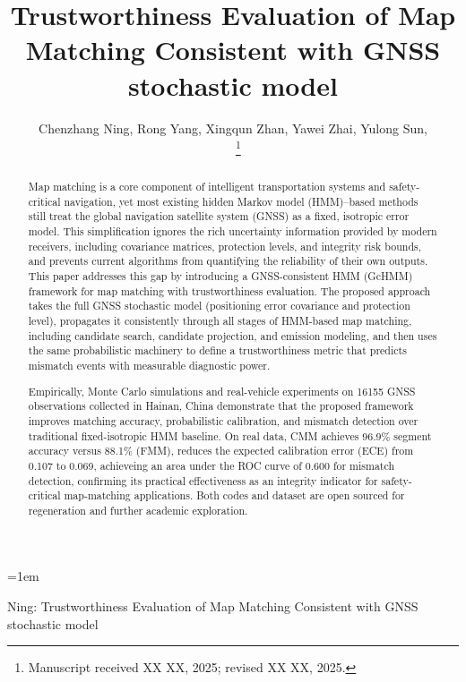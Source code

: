 \documentclass[letterpaper,journal]{IEEEtran}
\begin{document}
\emergencystretch=1em

\title{Trustworthiness Evaluation of Map Matching Consistent with GNSS stochastic model}

\author{Chenzhang Ning, Rong Yang, Xingqun Zhan, Yawei Zhai, Yulong Sun, \\~%
\thanks{Manuscript received XX XX, 2025; revised XX XX, 2025.}}

%
{Ning: Trustworthiness Evaluation of Map Matching Consistent with GNSS stochastic model}


\maketitle

\begin{abstract}
Map matching is a core component of intelligent transportation systems and
safety-critical navigation, yet most existing hidden Markov model (HMM)–based
methods still treat the global navigation satellite system (GNSS) as a fixed, isotropic error model. This simplification ignores the rich
uncertainty information provided by modern receivers, including covariance
matrices, protection levels, and integrity risk bounds, and prevents current
algorithms from quantifying the reliability of their own outputs. This paper
addresses this gap by introducing a GNSS-consistent HMM (GcHMM) framework
for map matching with trustworthiness evaluation. The proposed approach
takes the full GNSS stochastic model (positioning error covariance and protection 
level), propagates it consistently through all stages of HMM-based
map matching, including candidate search, candidate projection, and emission
modeling, and then uses the same probabilistic machinery to define a
trustworthiness metric that predicts mismatch events with measurable diagnostic
power.

Empirically, Monte Carlo simulations and real-vehicle experiments
on 16155 GNSS observations collected in Hainan, China demonstrate
that the proposed framework improves matching accuracy,
probabilistic calibration, and mismatch detection over traditional
fixed-isotropic HMM baseline. On real data, CMM achieves 96.9\%
segment accuracy versus 88.1\% (FMM), reduces the expected
calibration error (ECE) from 0.107 to 0.069, achieveing an area under 
the ROC curve of 0.600 for mismatch detection,
confirming its practical effectiveness as an integrity indicator for
safety-critical map-matching applications. Both codes and dataset are open sourced
for regeneration and further academic exploration.
\end{abstract}
\end{document}

